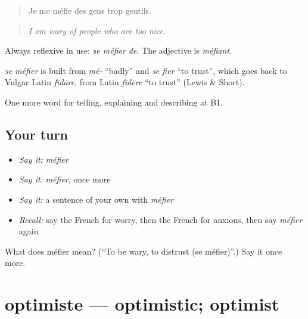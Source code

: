 \begin{quote}
Je me méfie des gens trop gentils.
\end{quote}

\begin{quote}
\emph{I am wary of people who are too nice.}
\end{quote}

Always reflexive in use: \emph{se méfier de}. The adjective is \emph{méfiant}.

\begin{cousinweb}
\emph{se méfier} is built from \emph{mé-} \textquotedblleft{}badly\textquotedblright{} and \emph{se fier} \textquotedblleft{}to trust\textquotedblright{}, which goes back to Vulgar Latin \emph{fīdāre}, from Latin \emph{fīdere} \textquotedblleft{}to trust\textquotedblright{} (Lewis \& Short).
\end{cousinweb}

\begin{grammarlens}[title={What you've built}]
One more word for telling, explaining and describing at B1.
\end{grammarlens}

\subsection*{Your turn}
\begin{itemize}
\raggedright
  \item \emph{Say it:} \emph{méfier}
  \item \emph{Say it:} \emph{méfier}, once more
  \item \emph{Say it:} a sentence of your own with \emph{méfier}
  \item \emph{Recall:} say the French for worry, then the French for anxious, then say \emph{méfier} again
\end{itemize}

\begin{tcolorbox}[breakable,colback=teal!4,colframe=teal!35!black,title={Before you move on}]
What does méfier mean? (\textquotedblleft{}To be wary, to distrust (se méfier)\textquotedblright{}.) Say it once more.
\end{tcolorbox}
\section[optimiste]{optimiste — optimistic; optimist}

\label{lesson:FR-C476-optimiste}



